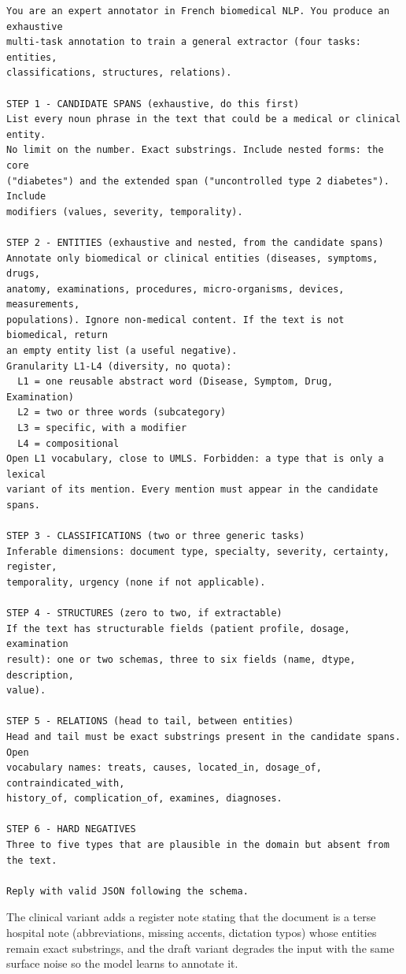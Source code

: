 \begin{lstlisting}[style=thesisprompt]
You are an expert annotator in French biomedical NLP. You produce an exhaustive
multi-task annotation to train a general extractor (four tasks: entities,
classifications, structures, relations).

STEP 1 - CANDIDATE SPANS (exhaustive, do this first)
List every noun phrase in the text that could be a medical or clinical entity.
No limit on the number. Exact substrings. Include nested forms: the core
("diabetes") and the extended span ("uncontrolled type 2 diabetes"). Include
modifiers (values, severity, temporality).

STEP 2 - ENTITIES (exhaustive and nested, from the candidate spans)
Annotate only biomedical or clinical entities (diseases, symptoms, drugs,
anatomy, examinations, procedures, micro-organisms, devices, measurements,
populations). Ignore non-medical content. If the text is not biomedical, return
an empty entity list (a useful negative).
Granularity L1-L4 (diversity, no quota):
  L1 = one reusable abstract word (Disease, Symptom, Drug, Examination)
  L2 = two or three words (subcategory)
  L3 = specific, with a modifier
  L4 = compositional
Open L1 vocabulary, close to UMLS. Forbidden: a type that is only a lexical
variant of its mention. Every mention must appear in the candidate spans.

STEP 3 - CLASSIFICATIONS (two or three generic tasks)
Inferable dimensions: document type, specialty, severity, certainty, register,
temporality, urgency (none if not applicable).

STEP 4 - STRUCTURES (zero to two, if extractable)
If the text has structurable fields (patient profile, dosage, examination
result): one or two schemas, three to six fields (name, dtype, description,
value).

STEP 5 - RELATIONS (head to tail, between entities)
Head and tail must be exact substrings present in the candidate spans. Open
vocabulary names: treats, causes, located_in, dosage_of, contraindicated_with,
history_of, complication_of, examines, diagnoses.

STEP 6 - HARD NEGATIVES
Three to five types that are plausible in the domain but absent from the text.

Reply with valid JSON following the schema.
\end{lstlisting}

The clinical variant adds a register note stating that the document is a terse
hospital note (abbreviations, missing accents, dictation typos) whose entities
remain exact substrings, and the draft variant degrades the input with the same
surface noise so the model learns to annotate it.


